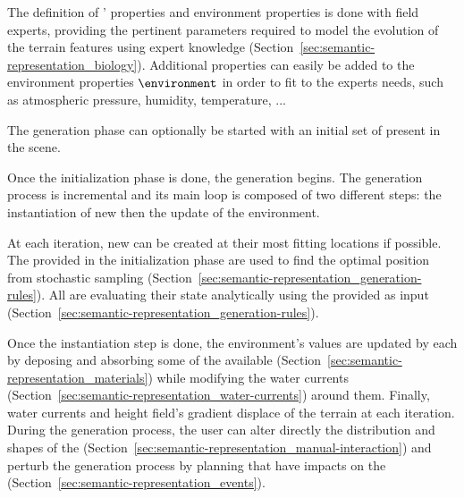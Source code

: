 The definition of ' properties and environment properties is done with field experts, providing the pertinent parameters required to model the evolution of the terrain features using expert knowledge (Section~\ref{sec:semantic-representation_biology}). Additional properties can easily be added to the environment properties $\environment$ in order to fit to the experts needs, such as atmospheric pressure, humidity, temperature, ... 

The generation phase can optionally be started with an initial set of  present in the scene. 

Once the initialization phase is done, the generation begins. The generation process is incremental and its main loop is composed of two different steps: the instantiation of new  then the update of the environment.

At each iteration, new  can be created at their most fitting locations if possible. The  provided in the initialization phase are used to find the optimal position from stochastic sampling (Section~\ref{sec:semantic-representation_generation-rules}). 
All  are evaluating their state analytically using the  provided as input (Section~\ref{sec:semantic-representation_generation-rules}).

Once the instantiation step is done, the environment's values are updated by each  by deposing and absorbing some of the available  (Section~\ref{sec:semantic-representation_materials}) while modifying the water currents (Section~\ref{sec:semantic-representation_water-currents}) around them. Finally, water currents and height field's gradient displace  of the terrain at each iteration.
During the generation process, the user can alter directly the distribution and shapes of the  (Section~\ref{sec:semantic-representation_manual-interaction}) and perturb the generation process by planning  that have impacts on the  (Section~\ref{sec:semantic-representation_events}).


